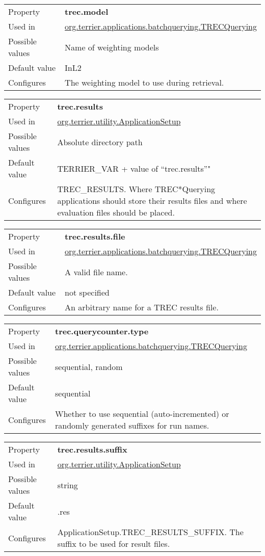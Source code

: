 \begin{longtable}[]{@{}ll@{}}
\toprule
Property & \textbf{trec.model}\tabularnewline
Used in &
\href{javadoc/org/terrier/applications/batchquerying/TRECQuerying.html}{org.terrier.applications.batchquerying.TRECQuerying}\tabularnewline
Possible values & Name of weighting models\tabularnewline
Default value & InL2\tabularnewline
Configures & The weighting model to use during retrieval.\tabularnewline
\bottomrule
\end{longtable}

\begin{longtable}[]{@{}ll@{}}
\toprule
Property & \textbf{trec.results}\tabularnewline
Used in &
\href{javadoc/org/terrier/utility/ApplicationSetup.html}{org.terrier.utility.ApplicationSetup}\tabularnewline
Possible values & Absolute directory path\tabularnewline
Default value & TERRIER\_VAR + value of ``trec.results''"\tabularnewline
Configures & TREC\_RESULTS. Where TREC*Querying applications should
store their results files and where evaluation files should be
placed.\tabularnewline
\bottomrule
\end{longtable}

\begin{longtable}[]{@{}ll@{}}
\toprule
Property & \textbf{trec.results.file}\tabularnewline
Used in &
\href{javadoc/org/terrier/applications/batchquerying/TRECQuerying.html}{org.terrier.applications.batchquerying.TRECQuerying}\tabularnewline
Possible values & A valid file name.\tabularnewline
Default value & not specified\tabularnewline
Configures & An arbitrary name for a TREC results file.\tabularnewline
\bottomrule
\end{longtable}

\begin{longtable}[]{@{}ll@{}}
\toprule
Property & \textbf{trec.querycounter.type}\tabularnewline
Used in &
\href{javadoc/org/terrier/applications/batchquerying/TRECQuerying.html}{org.terrier.applications.batchquerying.TRECQuerying}\tabularnewline
Possible values & sequential, random\tabularnewline
Default value & sequential\tabularnewline
Configures & Whether to use sequential (auto-incremented) or randomly
generated suffixes for run names.\tabularnewline
\bottomrule
\end{longtable}

\begin{longtable}[]{@{}ll@{}}
\toprule
Property & \textbf{trec.results.suffix}\tabularnewline
Used in &
\href{javadoc/org/terrier/utility/ApplicationSetup.html}{org.terrier.utility.ApplicationSetup}\tabularnewline
Possible values & string\tabularnewline
Default value & .res\tabularnewline
Configures & ApplicationSetup.TREC\_RESULTS\_SUFFIX. The suffix to be
used for result files.\tabularnewline
\bottomrule
\end{longtable}

